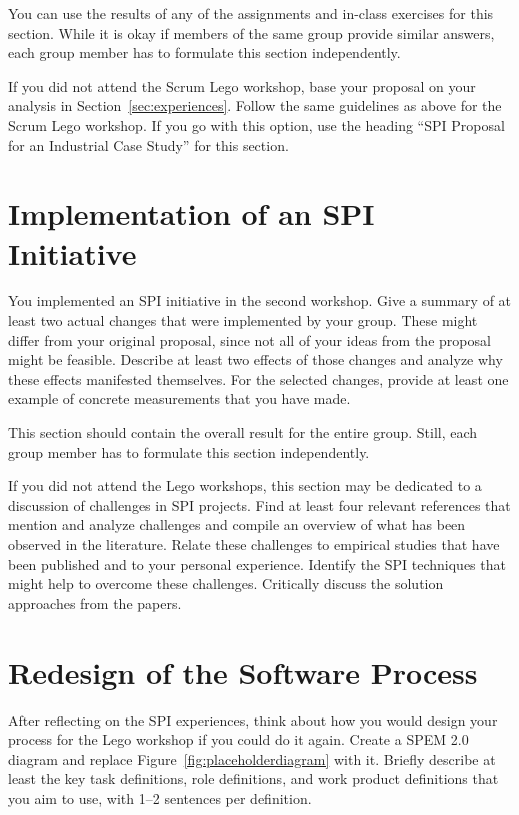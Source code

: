 \documentclass[conference]{IEEEtran}
\begin{document}
You can use the results of any of the assignments and in-class exercises for this section. While it is okay if members of the same group provide similar answers, each group member has to formulate this section independently.

If you did not attend the Scrum Lego workshop, base your proposal on your analysis in Section~\ref{sec:experiences}. Follow the same guidelines as above for the Scrum Lego workshop. If you go with this option, use the heading ``SPI Proposal for an Industrial Case Study'' for this section.

\section{Implementation of an SPI Initiative}
\label{sec:implementation}
You implemented an SPI initiative in the second workshop.
Give a summary of at least two actual changes that were implemented by your group. These might differ from your original proposal, since not all of your ideas from the proposal might be feasible. Describe at least two effects of those changes and analyze why these effects manifested themselves.
For the selected changes, provide at least one example of concrete measurements that you have made.

This section should contain the overall result for the entire group. Still, each group member has to formulate this section independently.

If you did not attend the Lego workshops, this section may be dedicated to a discussion of challenges in SPI projects. Find at least four relevant references that mention and analyze challenges and compile an overview of what has been observed in the literature. Relate these challenges to empirical studies that have been published and to your personal experience. Identify the SPI techniques that might help to overcome these challenges. Critically discuss the solution approaches from the papers.

\section{Redesign of the Software Process}
\label{sec:redesign}
After reflecting on the SPI experiences, think about how you would design your process for the Lego workshop if you could do it again.
Create a SPEM 2.0 diagram and replace Figure~\ref{fig:placeholderdiagram} with it.
Briefly describe at least the key task definitions, role definitions, and work product definitions that you aim to use, with 1--2 sentences per definition.
\end{document}
